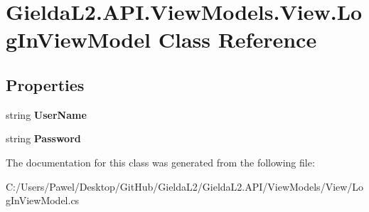 \hypertarget{class_gielda_l2_1_1_a_p_i_1_1_view_models_1_1_view_1_1_log_in_view_model}{}\section{Gielda\+L2.\+A\+P\+I.\+View\+Models.\+View.\+Log\+In\+View\+Model Class Reference}
\label{class_gielda_l2_1_1_a_p_i_1_1_view_models_1_1_view_1_1_log_in_view_model}
\subsection*{Properties}
\begin{DoxyCompactItemize}
\item 
\mbox{\label{class_gielda_l2_1_1_a_p_i_1_1_view_models_1_1_view_1_1_log_in_view_model_a9a28e07adbe2f2ba0c1f12861455049f}} 
string {\bfseries User\+Name}
\item 
\mbox{\label{class_gielda_l2_1_1_a_p_i_1_1_view_models_1_1_view_1_1_log_in_view_model_a96bd97b93d24fbae8af03caadd2ea090}} 
string {\bfseries Password}
\end{DoxyCompactItemize}


The documentation for this class was generated from the following file\+:\begin{DoxyCompactItemize}
\item 
C\+:/\+Users/\+Pawel/\+Desktop/\+Git\+Hub/\+Gielda\+L2/\+Gielda\+L2.\+A\+P\+I/\+View\+Models/\+View/Log\+In\+View\+Model.\+cs\end{DoxyCompactItemize}
